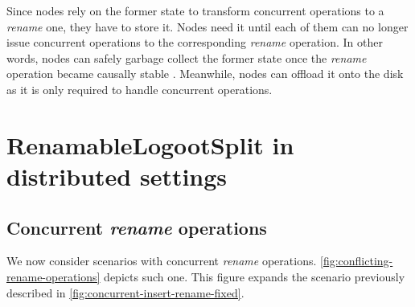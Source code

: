 \documentclass[10pt,journal,compsoc]{IEEEtran}
\begin{document}
Since nodes rely on the former state to transform concurrent operations to a \emph{rename} one, they have to store it.
Nodes need it until each of them can no longer issue concurrent operations to the corresponding \emph{rename} operation.
In other words, nodes can safely garbage collect the former state once the \emph{rename} operation became causally stable \cite{10.1007/978-3-662-43352-2_11}.
Meanwhile, nodes can offload it onto the disk as it is only required to handle concurrent operations.

\section{RenamableLogootSplit in distributed settings}

\label{sec:distributed-rls}

\subsection{Concurrent \emph{rename} operations}

We now consider scenarios with concurrent \emph{rename} operations.
\autoref{fig:conflicting-rename-operations} depicts such one.
This figure expands the scenario previously described in \autoref{fig:concurrent-insert-rename-fixed}.
\end{document}

